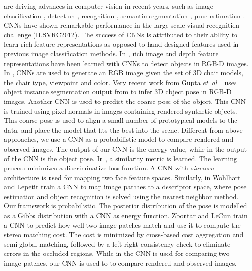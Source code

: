 \documentclass[10pt,letterpaper]{article}
\newcommand{\etal}{\mbox{\emph{et al.\ }}}
\begin{document}
are driving advances in computer vision in recent years, such as image classification \cite{krizhevsky_cnn_2012}, detection \cite{zhang_rcnn_2014}, recognition \cite{agrawal_nn_2014,oquab_cnn_2014}, semantic segmentation \cite{long_shelhamer_fcn_2015}, pose estimation \cite{toshev_pose_2014}.
CNNs have shown remarkable performance in the large-scale visual recognition challenge (ILSVRC2012). 
The success of CNNs is attributed to their ability to learn rich feature representations as opposed to hand-designed features used in previous image classification methods. 
In \cite{gupta_ECCV14}, rich image and depth feature representations have been learned with CNNs to detect objects in RGB-D images. 
In \cite{brox_2015}, CNNs are used to generate an RGB image given the set of 3D chair models, the chair type, viewpoint and color.
Very recent work from Gupta \etal \cite{Gupta_pose_2015} uses object instance segmentation output from \cite{gupta_ECCV14} to infer 3D object pose in RGB-D images.
Another CNN is used to predict the coarse pose of the object. This CNN is trained using pixel normals in images containing rendered synthetic objects.
This coarse pose is used to align a small number of prototypical models to the data, and place the model that fits the best into the scene.
Different from above approaches, we use a CNN as a probabilistic model to compare rendered and observed images. The output of our CNN is the energy value, while in \cite{Gupta_pose_2015} the output of the CNN is the object pose.
In \cite{Chopra_2005}, a similarity metric is learned. The learning process minimizes a discriminative loss function.
A CNN with \textit{siamese} architecture is used for mapping two face feature spaces. Similarly, in \cite{wohlhart2015learning} Wohlhart and Lepetit train a CNN to map image patches to a descriptor space, where pose estimation and object recognition is solved using the nearest neighbor method.  
Our framework is probabilistic. The posterior distribution of the pose is modelled as a Gibbs distribution with a CNN as energy function.
Zbontar and LeCun \cite{LeCun2014} train a CNN to predict how well two image patches match and use it to compute the stereo matching cost. 
The cost is minimized by cross-based cost aggregation and semi-global matching, followed by a left-right consistency check to eliminate errors in the
occluded regions.
While in \cite{LeCun2014} the CNN is used for comparing two image patches, our CNN is used to to compare rendered and observed images.
\end{document}
